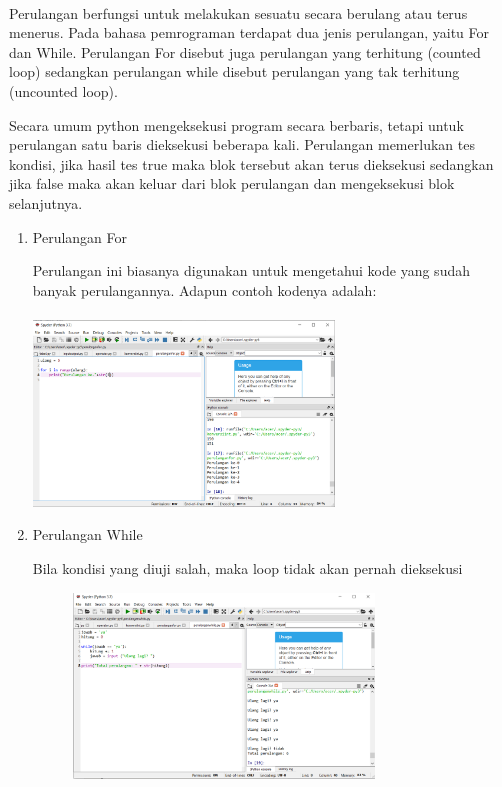 \paragraph{}
            Perulangan berfungsi untuk melakukan sesuatu secara berulang atau terus menerus. Pada bahasa pemrograman terdapat dua jenis perulangan, yaitu For dan While. Perulangan For disebut juga perulangan yang terhitung (counted loop) sedangkan perulangan while disebut perulangan yang tak terhitung (uncounted loop).
            \par
            Secara umum python mengeksekusi program secara berbaris, tetapi untuk perulangan satu baris dieksekusi beberapa kali. Perulangan memerlukan tes kondisi, jika hasil tes true maka blok tersebut akan terus dieksekusi sedangkan jika false maka akan keluar dari blok perulangan dan mengeksekusi blok selanjutnya.
\begin{enumerate}
    \item Perulangan For
    \par Perulangan ini biasanya digunakan untuk mengetahui kode yang sudah banyak perulangannya. Adapun contoh kodenya adalah:
    \paragraph{}
                 \centerline{\includegraphics[width=8cm]{figures/perulanganfor.PNG}}
    
    \item Perulangan While
    \par Bila kondisi yang diuji salah, maka loop tidak akan pernah dieksekusi
    \begin{figure}[h]
                 \centerline{\includegraphics[width=8cm]{figures/perulanganwhile.PNG}}
        \end{figure}
    
\end{enumerate}

